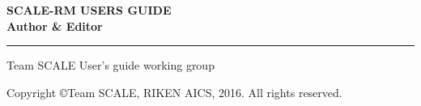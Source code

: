 \newpage
\thispagestyle{empty}

\vspace{10mm}
{\large{\bf SCALE-RM USERS GUIDE}}\\


\vspace{10mm}
{\large{\bf Author \& Editor}}\\
\hrule width 90mm
\begin{tabbing}
Team SCALE User's guide working group\\
\end{tabbing}


\vspace{110mm}
\begin{flushright}

\vspace{10mm}
Copyright \copyright Team SCALE, RIKEN AICS, 2016. All rights reserved.
\end{flushright}

